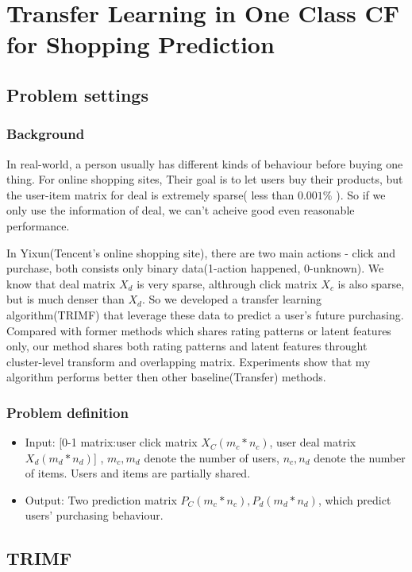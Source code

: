\chapter{Transfer Learning in One Class CF for Shopping Prediction}
\label{chp:trimf}
\section{Problem settings}
\subsection{Background}
\par{
In real-world, a person usually has different kinds of behaviour before buying one thing. For online shopping sites, Their goal is to let users buy their products, but the user-item matrix for deal is extremely sparse( less than $0.001\%$ ). So if we only use the information of deal, we can't acheive good even reasonable performance. 

In Yixun(Tencent's online shopping site), there are two main actions - click and purchase, both consists only binary data(1-action happened, 0-unknown). We know that deal matrix $X_d$ is very sparse, althrough click matrix $X_c$ is also sparse, but is much denser than $X_d$. So we developed a transfer learning algorithm(TRIMF) that leverage these data to predict a user's future purchasing. Compared with former methods which shares rating patterns or latent features only, our method shares both rating patterns and latent features throught cluster-level transform and overlapping matrix. Experiments show that my algorithm performs better then other baseline(Transfer) methods.}

\subsection{Problem definition}
  \begin{itemize}
  \item Input: [0-1 matrix:user click matrix $X_C(m_c*n_c)$, user deal matrix $X_d(m_d*n_d)$] , $m_c, m_d$ denote the number of users, $n_c, n_d$ denote the number of items. Users and items are partially shared.
  \item Output: Two prediction matrix $P_C(m_c*n_c), P_d(m_d*n_d)$, which predict users' purchasing behaviour.
  \end{itemize}



\section{TRIMF}
